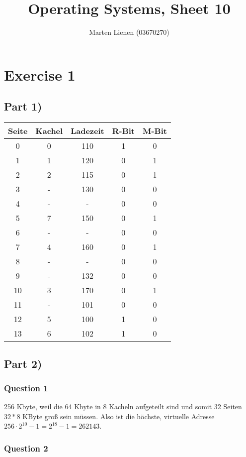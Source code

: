 \documentclass[10pt,a4paper]{article}
\title{Operating Systems, Sheet 10}
\author{Marten Lienen (03670270)}
\begin{document}
\maketitle

\section*{Exercise 1}

\subsection*{Part 1)}

\begin{tabular}{c|c|c|c|c}
  Seite & Kachel & Ladezeit & R-Bit & M-Bit\\\hline
  0 & 0 & 110 & 1 & 0\\
  1 & 1 & 120 & 0 & 1\\
  2 & 2 & 115 & 0 & 1\\
  3 & - & 130 & 0 & 0\\
  4 & - & - & 0 & 0\\
  5 & 7 & 150 & 0 & 1\\
  6 & - & - & 0 & 0\\
  7 & 4 & 160 & 0 & 1\\
  8 & - & - & 0 & 0\\
  9 & - & 132 & 0 & 0\\
  10 & 3 & 170 & 0 & 1\\
  11 & - & 101 & 0 & 0\\
  12 & 5 & 100 & 1 & 0\\
  13 & 6 & 102 & 1 & 0
\end{tabular}

\subsection*{Part 2)}

\subsubsection*{Question 1}

256 Kbyte, weil die 64 Kbyte in 8 Kacheln aufgeteilt sind und somit 32 Seiten $32 * 8$ KByte groß sein müssen.
Also ist die höchste, virtuelle Adresse $256 \cdot 2^{10} - 1 = 2^{18} - 1 = 262143$.

\subsubsection*{Question 2}
\end{document}
